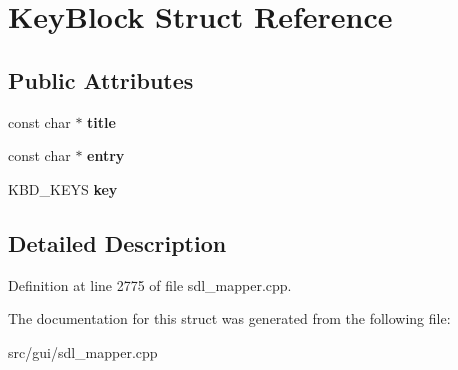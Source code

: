 \hypertarget{structKeyBlock}{\section{Key\-Block Struct Reference}
\label{structKeyBlock}
}
\subsection*{Public Attributes}
\begin{DoxyCompactItemize}
\item 
\hypertarget{structKeyBlock_aa8f0583008d486e791f4712f7206c256}{const char $\ast$ {\bfseries title}}\label{structKeyBlock_aa8f0583008d486e791f4712f7206c256}

\item 
\hypertarget{structKeyBlock_a025404788705e95fb7d9484ee068dd50}{const char $\ast$ {\bfseries entry}}\label{structKeyBlock_a025404788705e95fb7d9484ee068dd50}

\item 
\hypertarget{structKeyBlock_ad7f402307cea47b73666058183ded837}{K\-B\-D\-\_\-\-K\-E\-Y\-S {\bfseries key}}\label{structKeyBlock_ad7f402307cea47b73666058183ded837}

\end{DoxyCompactItemize}


\subsection{Detailed Description}


Definition at line 2775 of file sdl\-\_\-mapper.\-cpp.



The documentation for this struct was generated from the following file\-:\begin{DoxyCompactItemize}
\item 
src/gui/sdl\-\_\-mapper.\-cpp\end{DoxyCompactItemize}
